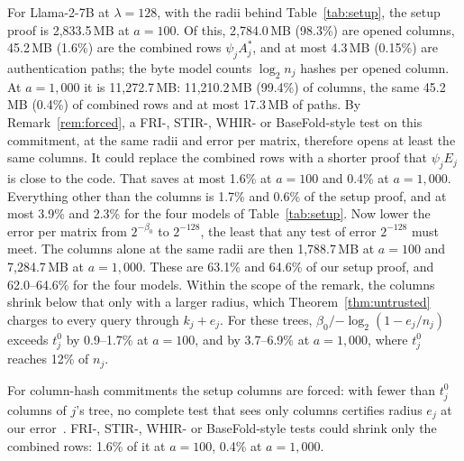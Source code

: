  For Llama-2-7B at $\lambda=128$, with the radii behind
Table~\ref{tab:setup}, the setup proof is 2{,}833.5\,MB at $a=100$. Of this, 2{,}784.0\,MB (98.3\%)
are opened columns, 45.2\,MB (1.6\%) are the combined rows $\psi_jA^*_j$, and at most 4.3\,MB
(0.15\%) are authentication paths; the byte model counts $\log_2n_j$ hashes per opened column. At
$a=1{,}000$ it is 11{,}272.7\,MB: 11{,}210.2\,MB (99.4\%) of columns, the same 45.2\,MB (0.4\%) of
combined rows and at most 17.3\,MB of paths. By Remark~\ref{rem:forced}, a FRI-, STIR-, WHIR- or
BaseFold-style test on this commitment, at the same radii and error per matrix, therefore opens at
least the same columns. It could replace the combined rows with a shorter proof that $\psi_jE_j$ is
close to the code. That saves at most 1.6\% at $a=100$ and 0.4\% at $a=1{,}000$. Everything other
than the columns is 1.7\% and 0.6\% of the setup proof, and at most 3.9\% and 2.3\% for the four
models of Table~\ref{tab:setup}. Now lower the error per matrix from $2^{-\beta_0}$ to $2^{-128}$,
the least that any test of error $2^{-128}$ must meet. The columns alone at the same radii are then
1{,}788.7\,MB at $a=100$ and 7{,}284.7\,MB at $a=1{,}000$. These are 63.1\% and 64.6\% of our setup
proof, and 62.0--64.6\% for the four models. Within the scope of the remark, the columns shrink
below that only with a larger radius, which Theorem~\ref{thm:untrusted} charges to every query
through $k_j+e_j$. For these trees, $\beta_0/{-\log_2(1-e_j/n_j)}$ exceeds $t^0_j$ by 0.9--1.7\% at
$a=100$, and by 3.7--6.9\% at $a=1{,}000$, where $t^0_j$ reaches 12\% of $n_j$.


For column-hash commitments the setup columns are forced: with fewer than $t^0_j$ columns of $j$'s
tree, no complete test that sees only columns certifies radius $e_j$ at our
error~\cite{fullversion}. FRI-, STIR-, WHIR- or BaseFold-style tests could shrink only the combined
rows: 1.6\% of it at $a=100$, 0.4\% at $a=1{,}000$.

